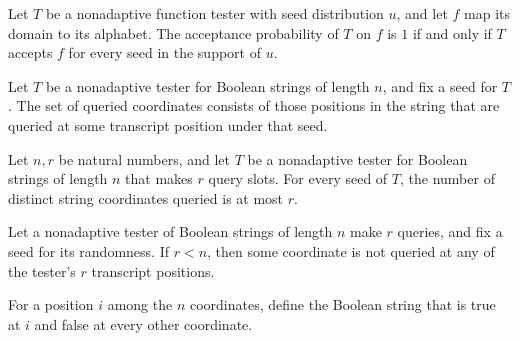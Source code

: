 \begin{theorem}
\label{FABL.acceptanceProbability_eq_one_iff_accepts_on_support}
\leanok
{}
Let $T$ be a nonadaptive function tester with seed distribution $
u$, and let $f$ map its domain to its alphabet. The acceptance probability of $T$ on $f$
is $1$ if and only if $T$ accepts $f$ for every seed in the support of $
u$.
\end{theorem}

\begin{definition}
\label{FABL.queriedCoordinates}
\leanok
{}
Let $T$ be a nonadaptive tester for Boolean strings of length $n$, and fix a seed for
$T$. The set of queried coordinates consists of those positions in the string that are
queried at some transcript position under that seed.
\end{definition}

\begin{theorem}
\label{FABL.queriedCoordinates_card_le}
\leanok
{}
Let $n,r$ be natural numbers, and let $T$ be a nonadaptive tester for Boolean strings of
length $n$ that makes $r$ query slots. For every seed of $T$, the number of distinct
string coordinates queried is at most $r$.
\end{theorem}

\begin{theorem}
\label{FABL.exists_unqueried_coordinate}
\leanok
{}
Let a nonadaptive tester of Boolean strings of length $n$ make $r$ queries, and fix a
seed for its randomness. If $r<n$, then some coordinate is not queried at any of the
tester's $r$ transcript positions.
\end{theorem}

\begin{definition}
\label{FABL.singletonTrueString}
\leanok
For a position $i$ among the $n$ coordinates, define the Boolean string that is true at
$i$ and false at every other coordinate.
\end{definition}

